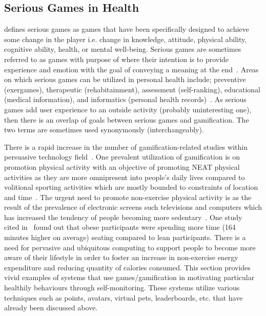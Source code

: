 \subsection{Serious Games in Health}
\cite{mccallum2012gamification} defines serious games as games that have been specifically designed to achieve some change in the player i.e. change in knowledge, attitude, physical ability, cognitive ability, health, or mental well-being. Serious games are sometimes referred to as games with purpose of  where their intention is to provide experience and emotion with the goal of conveying a meaning at the end~\citep{marsh2011serious}. Areas on which serious games can be utilized in personal health include; preventive (exergames), therapeutic (rehabitainment), assessment (self-ranking), educational (medical information), and informatics (personal health records)~\citep{mccallum2012gamification}. As serious games add user experience to an outside activity (probably uninteresting one), then there is an overlap of goals between serious games and gamification. The two terms are sometimes used synonymously (interchangeably).

There is a rapid increase in the number of gamification-related studies within persuasive technology field~\citep{hamari2014persuasive}. One prevalent utilization of gamification is on promotion physical activity with an objective of promoting NEAT physical activities as they are more omnipresent into people's daily lives compared to volitional sporting activities which are mostly bounded to constraints of location and time~\citep{fujiki2008neat}. The urgent need to promote non-exercise physical activity is as the result of the prevalence of electronic screens such televisions and computers which has increased the tendency of people becoming more sedentary~\citep{berkovsky2010physical}. One study~\citep{levine2006non} cited in~\cite{fujiki2008neat} found out that obese participants were spending more time (164 minutes higher on average) seating  compared to lean participants. There is a need for pervasive and ubiquitous computing to support people to become more aware of their lifestyle in order to foster an increase in non-exercise energy expenditure and reducing quantity of calories consumed. This section provides vivid examples of systems that use games/gamification in motivating particular healthily  behaviours through self-monitoring. These systems utilize various techniques such as points, avatars, virtual pets, leaderboards, etc. that have already been discussed above. 

